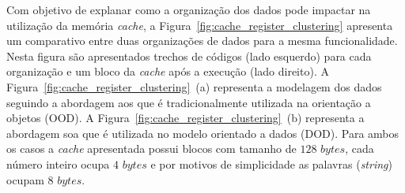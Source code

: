 

Com objetivo de explanar como a organização dos dados pode impactar na utilização da memória \textit{cache}, a Figura~\ref{fig:cache_register_clustering} apresenta um comparativo entre duas organizações de dados para a mesma funcionalidade. 
Nesta figura são apresentados trechos de códigos (lado esquerdo) para cada organização e um bloco da \textit{cache} após a execução (lado direito).
A Figura~\ref{fig:cache_register_clustering}~(a) representa a modelagem dos dados seguindo a abordagem \ac{aos} que é tradicionalmente utilizada na orientação a objetos (OOD).
A Figura~\ref{fig:cache_register_clustering}~(b) representa a abordagem \ac{soa} que é utilizada no modelo orientado a dados (DOD).
Para ambos os casos a \textit{cache} apresentada possui blocos com tamanho de $128$ $bytes$, cada número inteiro ocupa $4$ $bytes$ e por motivos de simplicidade as palavras (\textit{string}) ocupam $8$ $bytes$. 


